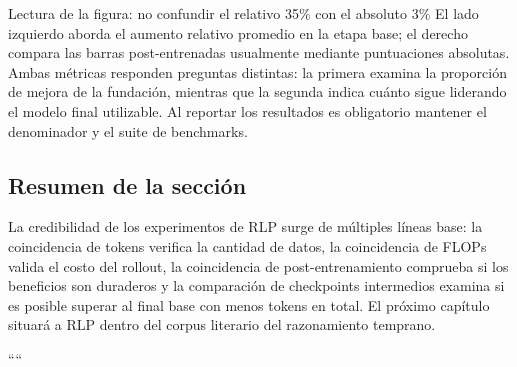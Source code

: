 \begin{knowledgebox}{Lectura de la figura: no confundir el relativo 35\% con el absoluto 3\%}
El lado izquierdo aborda el aumento relativo promedio en la etapa base; el derecho compara las barras post-entrenadas usualmente mediante puntuaciones absolutas. Ambas métricas responden preguntas distintas: la primera examina la proporción de mejora de la fundación, mientras que la segunda indica cuánto sigue liderando el modelo final utilizable. Al reportar los resultados es obligatorio mantener el denominador y el suite de benchmarks.
\end{knowledgebox}

\subsection{Resumen de la sección}

La credibilidad de los experimentos de RLP surge de múltiples líneas base: la coincidencia de tokens verifica la cantidad de datos, la coincidencia de FLOPs valida el costo del rollout, la coincidencia de post-entrenamiento comprueba si los beneficios son duraderos y la comparación de checkpoints intermedios examina si es posible superar al final base con menos tokens en total. El próximo capítulo situará a RLP dentro del corpus literario del razonamiento temprano.

````
